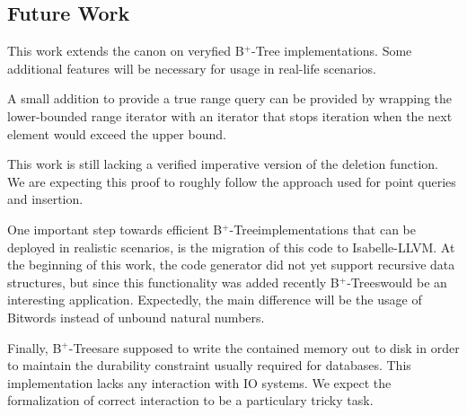 \documentclass[a4paper,UKenglish,cleveref, autoref, thm-restate]{lipics-v2021}
\newcommand{\btree}{B$^+$-Tree}
\newcommand{\btrees}{B$^+$-Trees}
\begin{document}
\subsection{Future Work}

This work extends the canon on veryfied \btree
implementations.
Some additional features will be necessary for
usage in real-life scenarios.

A small addition to provide a true
range query can be provided by wrapping the lower-bounded
range iterator with an iterator
that stops iteration when the next element
would exceed the upper bound.

This work is still lacking a verified imperative version
of the deletion function.
We are expecting this proof to roughly follow
the approach used for point queries and insertion.

One important step towards efficient
\btree implementations that can be deployed
in realistic scenarios, is the migration of this code
to Isabelle-LLVM. \cite{DBLP:conf/itp/Lammich19}
At the beginning of this work, the code generator did
not yet support recursive data structures, but since
this functionality was added recently \btrees would be an interesting application.
Expectedly, the main difference will be the usage of Bitwords
instead of unbound natural numbers.

Finally, \btrees are supposed to write the contained
memory out to disk in order to maintain the durability constraint
usually required for databases.
This implementation lacks any interaction with IO systems.
We expect the formalization of correct interaction 
to be a particulary tricky task.



\end{document}

